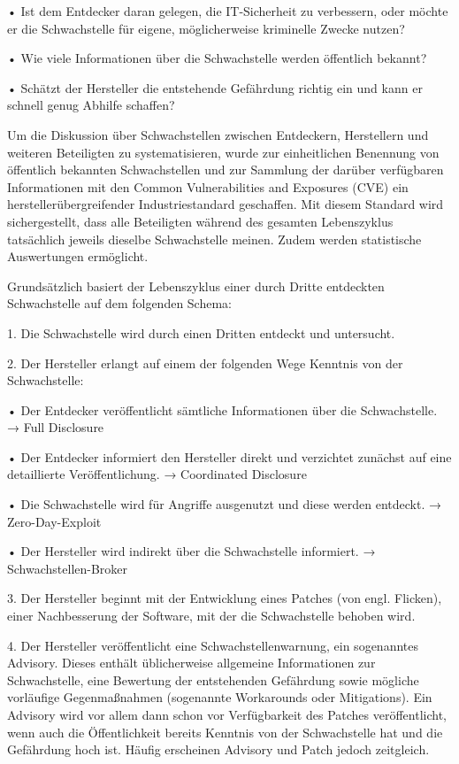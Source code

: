 \documentclass[12pt,oneside,a4paper,parskip]{scrbook}
\begin{document}
  • Ist dem Entdecker daran gelegen, die IT-Sicherheit zu verbessern, oder möchte er die
  Schwachstelle für eigene, möglicherweise kriminelle Zwecke nutzen?

  • Wie viele Informationen über die Schwachstelle werden öffentlich bekannt?

  • Schätzt der Hersteller die entstehende Gefährdung richtig ein und kann er schnell genug Abhilfe
  schaffen?

  Um die Diskussion über Schwachstellen zwischen Entdeckern, Herstellern und weiteren
  Beteiligten zu systematisieren, wurde zur einheitlichen Benennung von öffentlich bekannten Schwachstellen und zur Sammlung der darüber verfügbaren Informationen
  mit den Common Vulnerabilities and Exposures (CVE) ein herstellerübergreifender Industriestandard geschaffen. Mit diesem Standard wird sichergestellt, dass alle Beteiligten während des gesamten Lebenszyklus tatsächlich jeweils dieselbe Schwachstelle meinen. Zudem werden statistische Auswertungen ermöglicht.

  Grundsätzlich basiert der Lebenszyklus einer durch Dritte entdeckten Schwachstelle auf dem
  folgenden Schema:

  1. Die Schwachstelle wird durch einen Dritten entdeckt und untersucht.

  2. Der Hersteller erlangt auf einem der folgenden Wege Kenntnis von der Schwachstelle:

  • Der Entdecker veröffentlicht sämtliche Informationen über die Schwachstelle.
  → Full Disclosure

  • Der Entdecker informiert den Hersteller direkt und verzichtet zunächst auf eine detaillierte
  Veröffentlichung.
  → Coordinated Disclosure

  • Die Schwachstelle wird für Angriffe ausgenutzt und diese werden entdeckt.
  → Zero-Day-Exploit

  • Der Hersteller wird indirekt über die Schwachstelle informiert.
  → Schwachstellen-Broker

  3. Der Hersteller beginnt mit der Entwicklung eines Patches (von engl. Flicken), einer Nachbesserung der Software, mit der die Schwachstelle behoben wird.

  4. Der Hersteller veröffentlicht eine Schwachstellenwarnung, ein sogenanntes Advisory. Dieses
  enthält üblicherweise allgemeine Informationen zur Schwachstelle, eine Bewertung der
  entstehenden Gefährdung sowie mögliche vorläufige Gegenmaßnahmen (sogenannte
  Workarounds oder Mitigations). Ein Advisory wird vor allem dann schon vor Verfügbarkeit
  des Patches veröffentlicht, wenn auch die Öffentlichkeit bereits Kenntnis von der Schwachstelle hat und die Gefährdung hoch ist. Häufig erscheinen Advisory und Patch jedoch zeitgleich.
\end{document}
